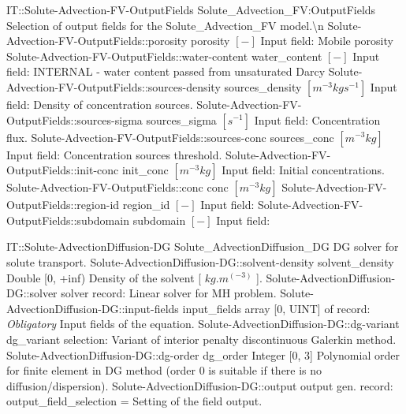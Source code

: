\begin{SelectionType}
	{IT::Solute-Advection-FV-OutputFields}
	{Solute{\_}Advection{\_}FV:OutputFields}
	{{{Selection of output fields for the Solute{\_}Advection{\_}FV model.{\textbackslash}n}%
}}
		\SelectionItem
			{Solute-Advection-FV-OutputFields::porosity}
			{porosity}
			{{{}{$[-]$}{ Input field: Mobile porosity}%
}}
		\SelectionItem
			{Solute-Advection-FV-OutputFields::water-content}
			{water{\_}content}
			{{{}{$[-]$}{ Input field: INTERNAL - water content passed from unsaturated Darcy}%
}}
		\SelectionItem
			{Solute-Advection-FV-OutputFields::sources-density}
			{sources{\_}density}
			{{{}{$[m^{-3}kgs^{-1}]$}{ Input field: Density of concentration sources.}%
}}
		\SelectionItem
			{Solute-Advection-FV-OutputFields::sources-sigma}
			{sources{\_}sigma}
			{{{}{$[s^{-1}]$}{ Input field: Concentration flux.}%
}}
		\SelectionItem
			{Solute-Advection-FV-OutputFields::sources-conc}
			{sources{\_}conc}
			{{{}{$[m^{-3}kg]$}{ Input field: Concentration sources threshold.}%
}}
		\SelectionItem
			{Solute-Advection-FV-OutputFields::init-conc}
			{init{\_}conc}
			{{{}{$[m^{-3}kg]$}{ Input field: Initial concentrations.}%
}}
		\SelectionItem
			{Solute-Advection-FV-OutputFields::conc}
			{conc}
			{{{}{$[m^{-3}kg]$}{ }%
}}
		\SelectionItem
			{Solute-Advection-FV-OutputFields::region-id}
			{region{\_}id}
			{{{}{$[-]$}{ Input field: }%
}}
		\SelectionItem
			{Solute-Advection-FV-OutputFields::subdomain}
			{subdomain}
			{{{}{$[-]$}{ Input field: }%
}}
\end{SelectionType}
\begin{RecordType}
	{IT::Solute-AdvectionDiffusion-DG}
	{Solute{\_}AdvectionDiffusion{\_}DG}
	{}%
	{}%
	{{{DG solver for solute transport.}%
}}
		\RecKey
			{Solute-AdvectionDiffusion-DG::solvent-density}
			{solvent{\_}density}
			{{Double [0, +inf)}}{}
			{ }
			{{{Density of the solvent [ }{$kg.m^(-3)$}{ ].}%
}}
		\RecKey
			{Solute-AdvectionDiffusion-DG::solver}
			{solver}
			{{record: }}{}
			{ \ValueDefault{{\{}{\}}}}
			{{{Linear solver for MH problem.}%
}}
		\RecKey
			{Solute-AdvectionDiffusion-DG::input-fields}
			{input{\_}fields}
			{{array [0, UINT] of }{record: }}{}
			{ \it{Obligatory}}
			{{{Input fields of the equation.}%
}}
		\RecKey
			{Solute-AdvectionDiffusion-DG::dg-variant}
			{dg{\_}variant}
			{{selection: }}{}
			{ }
			{{{Variant of interior penalty discontinuous Galerkin method.}%
}}
		\RecKey
			{Solute-AdvectionDiffusion-DG::dg-order}
			{dg{\_}order}
			{{Integer [0, 3]}}{}
			{ }
			{{{Polynomial order for finite element in DG method (order 0 is suitable if there is no diffusion/dispersion).}%
}}
		\RecKey
			{Solute-AdvectionDiffusion-DG::output}
			{output}
			{{gen. record: }}{{output{\_}field{\_}selection}{ = }}
			{ }
			{{{Setting of the field output.}%
}}
\end{RecordType}
